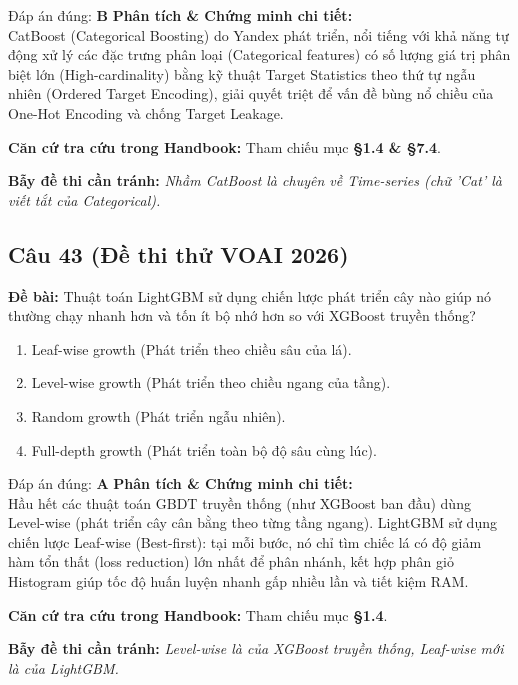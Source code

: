 \documentclass[10pt,a4paper]{article}
\begin{document}
\begin{solbox}{Đáp án đúng: \textbf{B}}
\textbf{Phân tích \& Chứng minh chi tiết:} \\
CatBoost (Categorical Boosting) do Yandex phát triển, nổi tiếng với khả năng tự động xử lý các đặc trưng phân loại (Categorical features) có số lượng giá trị phân biệt lớn (High-cardinality) bằng kỹ thuật Target Statistics theo thứ tự ngẫu nhiên (Ordered Target Encoding), giải quyết triệt để vấn đề bùng nổ chiều của One-Hot Encoding và chống Target Leakage.

\vspace{0.4em}
\textbf{Căn cứ tra cứu trong Handbook:} Tham chiếu mục \textbf{§1.4 \& §7.4}.

\vspace{0.4em}
\textbf{Bẫy đề thi cần tránh:} \textit{Nhầm CatBoost là chuyên về Time-series (chữ 'Cat' là viết tắt của Categorical).}
\end{solbox}
\vspace{0.5em}


\subsection*{Câu 43 (Đề thi thử VOAI 2026)}
\textbf{Đề bài:} Thuật toán LightGBM sử dụng chiến lược phát triển cây nào giúp nó thường chạy nhanh hơn và tốn ít bộ nhớ hơn so với XGBoost truyền thống?

\begin{enumerate}[label=\textbf{\Alph*.}]
    \item Leaf-wise growth (Phát triển theo chiều sâu của lá).
    \item Level-wise growth (Phát triển theo chiều ngang của tầng).
    \item Random growth (Phát triển ngẫu nhiên).
    \item Full-depth growth (Phát triển toàn bộ độ sâu cùng lúc).
\end{enumerate}

\begin{solbox}{Đáp án đúng: \textbf{A}}
\textbf{Phân tích \& Chứng minh chi tiết:} \\
Hầu hết các thuật toán GBDT truyền thống (như XGBoost ban đầu) dùng Level-wise (phát triển cây cân bằng theo từng tầng ngang). LightGBM sử dụng chiến lược Leaf-wise (Best-first): tại mỗi bước, nó chỉ tìm chiếc lá có độ giảm hàm tổn thất (loss reduction) lớn nhất để phân nhánh, kết hợp phân giỏ Histogram giúp tốc độ huấn luyện nhanh gấp nhiều lần và tiết kiệm RAM.

\vspace{0.4em}
\textbf{Căn cứ tra cứu trong Handbook:} Tham chiếu mục \textbf{§1.4}.

\vspace{0.4em}
\textbf{Bẫy đề thi cần tránh:} \textit{Level-wise là của XGBoost truyền thống, Leaf-wise mới là của LightGBM.}
\end{solbox}
\vspace{0.5em}
\end{document}
